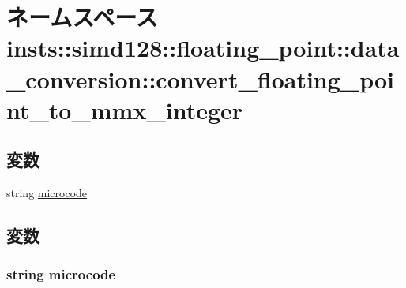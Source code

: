 \hypertarget{namespaceinsts_1_1simd128_1_1floating__point_1_1data__conversion_1_1convert__floating__point__to__mmx__integer}{
\section{ネームスペース insts::simd128::floating\_\-point::data\_\-conversion::convert\_\-floating\_\-point\_\-to\_\-mmx\_\-integer}
\label{namespaceinsts_1_1simd128_1_1floating__point_1_1data__conversion_1_1convert__floating__point__to__mmx__integer}
}
\subsection*{変数}
\begin{DoxyCompactItemize}
\item 
string \hyperlink{namespaceinsts_1_1simd128_1_1floating__point_1_1data__conversion_1_1convert__floating__point__to__mmx__integer_a770f11a173e99389a8802f0107ed8f52}{microcode}
\end{DoxyCompactItemize}


\subsection{変数}
\hypertarget{namespaceinsts_1_1simd128_1_1floating__point_1_1data__conversion_1_1convert__floating__point__to__mmx__integer_a770f11a173e99389a8802f0107ed8f52}{
\subsubsection[{microcode}]{\setlength{\rightskip}{0pt plus 5cm}string {\bf microcode}}}
\label{namespaceinsts_1_1simd128_1_1floating__point_1_1data__conversion_1_1convert__floating__point__to__mmx__integer_a770f11a173e99389a8802f0107ed8f52}
